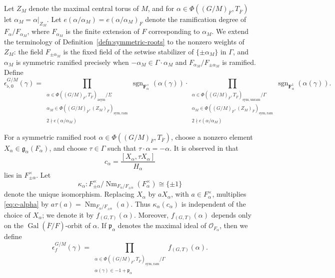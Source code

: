\documentclass[reqno]{amsart}
\numberwithin{equation}{subsection}
\newcommand{\F}{\mathbf{F}}
\newcommand{\sgn}{\operatorname{sgn}}
\newcommand{\Gal}{\operatorname{Gal}}
\newcommand{\ol}[1]{\overline{#1}}
\newcommand{\co}{\colon}
\newcommand\cO{\mathcal{O}}
\newcommand\frp{\mathfrak{p}}
\DeclareMathOperator{\Nm}{Nm}
\theoremstyle{remark}
\numberwithin{equation}{subsection}
\numberwithin{figure}{subsection}
\begin{document}
Let $Z_M$ denote the maximal central torus of $M$, and for $\alpha \in \Phi((G/M)_{\ol F}, T_{\ol F})$ let $\alpha_M = \alpha|_{Z_M}$. Let $e(\alpha/\alpha_M) = e(\alpha/\alpha_M)_F$ denote the ramification degree of $F_\alpha/F_{\alpha_M}$, where $F_{\alpha_M}$ is the finite extension of $F$ corresponding to $\alpha_M$. We extend the terminology of Definition~\ref{defn:symmetric-roots} to the nonzero weights of $Z_M$: the field $F_{\pm\alpha_M}$ is the fixed field of the setwise stabilizer of $\{\pm\alpha_M\}$ in $\Gamma$, and $\alpha_M$ is symmetric ramified precisely when $-\alpha_M \in \Gamma\cdot\alpha_M$ and $F_{\alpha_M}/F_{\pm\alpha_M}$ is ramified. Define
\begin{equation}\label{eqn:FKS-2}
\epsilon_{\flat,0}^{G/M}(\gamma) = \prod_{\substack{\alpha \in \Phi((G/M)_{\ol F},T_{\ol F})_{\mathrm{asym}}/\Sigma \\ \alpha_M \in \Phi((G/M)_{\ol F},(Z_M)_{\ol F})_{\mathrm{sym,ram}} \\ 2 \nmid e(\alpha/\alpha_M)}} \sgn_{\F_\alpha^\times}(\alpha(\gamma)) \cdot \prod_{\substack{\alpha \in \Phi((G/M)_{\ol F},T_{\ol F})_{\mathrm{sym,unram}}/\Gamma \\ \alpha_M \in \Phi((G/M)_{\ol F},(Z_M)_{\ol F})_{\mathrm{sym,ram}} \\ 2 \nmid e(\alpha/\alpha_M)}} \sgn_{\F_\alpha^1}(\alpha(\gamma)).
\end{equation}

For a symmetric ramified root $\alpha \in \Phi((G/M)_{\ol F}, T_{\ol F})$, choose a nonzero element $X_\alpha \in \mathfrak{g}_\alpha(F_\alpha)$, and choose $\tau \in \Gamma$ such that $\tau \cdot \alpha = -\alpha$. It is observed in \cite[\S 3.1]{Kal15} that
\begin{equation}\label{eq:c-alpha}
c_\alpha=\frac{[X_\alpha,\tau X_\alpha]}{H_\alpha}
\end{equation}
lies in $F_{\pm\alpha}^\times$. Let
\[
\kappa_\alpha\co F_{\pm \alpha}^\times/\Nm_{F_\alpha/F_{\pm\alpha}}(F_\alpha^\times) \cong \{\pm 1\}
\]
denote the unique isomorphism. Replacing $X_\alpha$ by $aX_\alpha$, with $a\in F_\alpha^\times$, multiplies \eqref{eq:c-alpha} by $a\tau(a)=\Nm_{F_\alpha/F_{\pm\alpha}}(a)$. Thus $\kappa_\alpha(c_\alpha)$ is independent of the choice of $X_\alpha$; we denote it by $f_{(G,T)}(\alpha)$. Moreover, $f_{(G,T)}(\alpha)$ depends only on the $\Gal(\ol F/F)$-orbit of $\alpha$. If $\frp_\alpha$ denotes the maximal ideal of $\cO_{F_\alpha}$, then we define
\begin{equation}\label{eqn:FKS-3}
\epsilon_f^{G/M}(\gamma) = \prod_{\substack{\alpha \in \Phi((G/M)_{\ol F},T_{\ol F})_{\mathrm{sym,ram}}/\Gamma \\ \alpha(\gamma) \in -1 + \frp_\alpha}} f_{(G,T)}(\alpha).
\end{equation}
\end{document}
